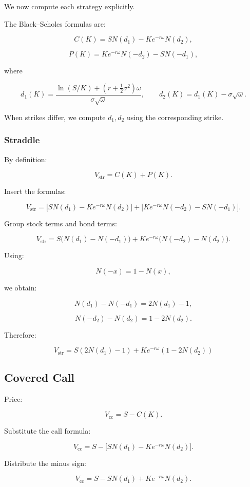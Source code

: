 \documentclass[11pt]{article}
\begin{document}
We now compute each strategy explicitly.

The Black--Scholes formulas are:

\[
C(K)=SN(d_1)-Ke^{-r\omega}N(d_2),
\]

\[
P(K)=Ke^{-r\omega}N(-d_2)-SN(-d_1),
\]

where

\[
d_1(K)=\frac{\ln(S/K)+(r+\frac12\sigma^2)\omega}{\sigma\sqrt{\omega}},
\qquad
d_2(K)=d_1(K)-\sigma\sqrt{\omega}.
\]

When strikes differ, we compute $d_1,d_2$ using the corresponding strike.

\subsubsection*{Straddle}

By definition:

\[
V_{\text{str}}=C(K)+P(K).
\]

Insert the formulas:

\[
V_{\text{str}}
=
\big[SN(d_1)-Ke^{-r\omega}N(d_2)\big]
+
\big[Ke^{-r\omega}N(-d_2)-SN(-d_1)\big].
\]

Group stock terms and bond terms:

\[
V_{\text{str}}
=
S\big(N(d_1)-N(-d_1)\big)
+
Ke^{-r\omega}\big(N(-d_2)-N(d_2)\big).
\]

Using:

\[
N(-x)=1-N(x),
\]

we obtain:

\[
N(d_1)-N(-d_1)=2N(d_1)-1,
\]

\[
N(-d_2)-N(d_2)=1-2N(d_2).
\]

Therefore:

\[
\boxed{
V_{\text{str}}
=
S(2N(d_1)-1)+Ke^{-r\omega}(1-2N(d_2))
}
\]

\subsection*{Covered Call}

Price:

\[
V_{\text{cc}}=S-C(K).
\]

Substitute the call formula:

\[
V_{\text{cc}}
=
S-\big[SN(d_1)-Ke^{-r\omega}N(d_2)\big].
\]

Distribute the minus sign:

\[
V_{\text{cc}}
=
S-SN(d_1)+Ke^{-r\omega}N(d_2).
\]
\end{document}

